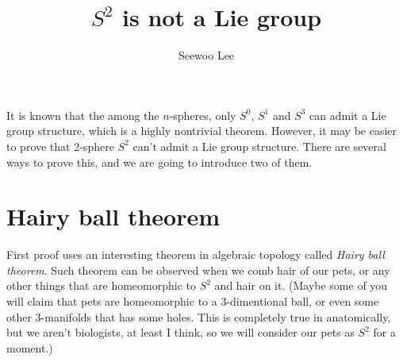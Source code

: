 \documentclass{article}
\title{$S^{2}$ is not a Lie group}
\author{Seewoo Lee}
\begin{document}
\maketitle

It is known that the among the $n$-spheres, only $S^{0}$, $S^{1}$ and $S^{3}$ can admit a Lie group structure, which is a highly nontrivial theorem. However, it may be easier to prove that 2-sphere $S^{2}$ can't admit a Lie group structure. 
There are several ways to prove this, and we are  going to introduce two of them. 

\section{Hairy ball theorem}
First proof uses an interesting theorem in algebraic topology called \emph{Hairy ball theorem}. 
Such theorem can be observed when we comb hair of our pets, or any other things that are homeomorphic to $S^{2}$ and hair on it. 
(Maybe some of you will claim that pets are homeomorphic to a 3-dimentional ball, or even some other 3-manifolds that has some holes. This is completely true in anatomically, but we aren't biologists, at least I think, so we will consider our pets as $S^{2}$ for a moment.) 
\end{document}
